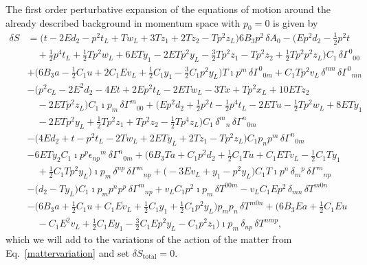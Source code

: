 \documentclass{ws-mpla}
\renewcommand{\(}{\left(}
\renewcommand{\)}{\right)}
\renewcommand{\[}{\left[}
\renewcommand{\]}{\right]}
\begin{document}
The first order perturbative expansion of the equations of motion around the already described background in momentum space with $p_0=0$ is given by
{\small
\begin{equation*}
  \begin{split}
    \delta S
    &=
    \Big( t - 2 E d_2  - p^2 t_L + T w_L + 3 T z_1 + 2 T z_2 - T p^2 z_L \Big) 6 B_3 p^2 {\,\delta A}_{0} - \Big( E p^2 d_2 - \tfrac{1}{2} p^2 t
    \\
    & \quad + \tfrac{1}{2} p^4 t_L + \tfrac{1}{2} T p^2 w_L + 6 E T y_1 - 2 E T p^2 y_L - \tfrac{3}{2} T p^2 z_1 - T p^2 z_2 + \tfrac{1}{2} T p^2 p^2 z_L \Big) C_1 {\,\delta\Gamma}^{0}{}_{0 0}
    \\
    & + \Big(6 B_3 a - \tfrac{1}{2} C_1 u + 2 C_1 E v_L + \tfrac{1}{2} C_1 y_1 - \tfrac{3}{2} C_1 p^2 y_L \Big) T \imath {p}^{m} {\,\delta\Gamma}^{0}{}_{0 m} + C_1 T p^2 v_L {\,\delta}^{m n} {\,\delta\Gamma}^{0}{}_{m n} 
    \\
    & - \Big( p^2 c_L - 2 E^2 d_2 - 4 E t + 2 E p^2 t_L - 2 E T w_L - 3 T x + T p^2 x_L + 10 E T z_2 
    \\
    & \quad - 2 E T p^2 z_L \Big) C_1 \imath {p}_{m} {\,\delta\Gamma}^{m}{}_{0 0}  + \Big( E p^2 d_2 +  \tfrac{1}{2} p^2 t - \tfrac{1}{2} p^4 t_L - 2 E T u - \tfrac{1}{2} T p^2 w_L + 8 E T y_1 
    \\
    & \quad - 2 E T p^2 y_L + \tfrac{1}{2} T p^2 z_1 + T p^2 z_2 - \tfrac{1}{2} T p^4  z_L \Big) C_1 {\,\delta}^{m}{}_{n} {\,\delta\Gamma}^{n}{}_{0 m} 
    \\
    & - \Big( 4 E d_2  +t -  p^2 t_L - 2 T w_L + 2 E T y_L + 2 T z_1 - T p^2 z_L \Big)  C_1 {p}_{n} {p}^{m} {\,\delta\Gamma}^{n}{}_{0 m} 
    \\
    & - 6  E T y_2 C_1 \imath {p}^{p} {\epsilon}_{n p}{}^{m} {\,\delta\Gamma}^{n}{}_{0 m} 
    + \Big(6 B_3 T a + C_1 p^2 d_2 + \tfrac{1}{2} C_1 T u + C_1 E T v_L - \tfrac{1}{2} C_1 T y_1
    \\
    & \quad + \tfrac{1}{2} C_1 T p^2 y_L \Big) \imath {p}_{m} {\,\delta}^{n p} {\,\delta\Gamma}^{m}{}_{n p} 
    + \Big( - 3 E v_L + y_1 - p^2 y_L\Big) C_1 T \imath {p}^{n} {\,\delta}_{m}{}^{p} {\,\delta\Gamma}^{m}{}_{n p} 
    \\
    & - \Big( d_2 - T y_L \Big) C_1 \imath {p}_{m} {p}^{n} {p}^{p} {\,\delta\Gamma}^{m}{}_{n p} 
    + v_L C_1 p^2 \imath {p}_{m} {\,\delta T}^{0 0 m} 
    - v_L C_1 E p^2 {\,\delta}_{m n} {\,\delta T}^{m 0 n} 
    \\
    & - \Big( 6  B_3 a + \tfrac{1}{2}  C_1 u + C_1 E v_L + \tfrac{1}{2}  C_1 y_1 + \tfrac{1}{2}  C_1 p^2 y_L \Big) {p}_{m} {p}_{n} {\,\delta T}^{m 0 n} 
    + \Big(6 B_3 E a + \tfrac{1}{2} C_1 E u
    \\
    & \quad - C_1 E^2 v_L + \tfrac{1}{2} C_1 E y_1 - \tfrac{3}{2} C_1 E p^2 y_L - C_1 p^2 z_1 \Big) \imath {p}_{m} {\,\delta}_{n p} {\,\delta T}^{n m p},
  \end{split}
\end{equation*}%
}%
which we will add to the variations of the action of the matter from Eq.~\eqref{mattervariation} and set $\delta S_{\text{total}} = 0$.
\end{document}
